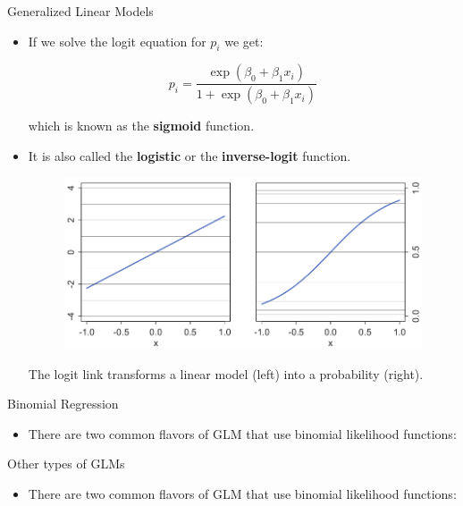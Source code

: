\documentclass[handout]{beamer}
\begin{document}
\begin{frame}{Generalized Linear Models}
\scriptsize{
\begin{itemize}

\item If we solve the logit equation for $p_i$ we get:

\begin{equation}
 p_i = \frac{\exp (\beta_0 + \beta_1 x_i)}{1+\exp (\beta_0 + \beta_1 x_i)}
\end{equation}

which is known as the \textbf{sigmoid} function.

\item It is also called the \textbf{logistic} or the \textbf{inverse-logit} function.

\begin{figure}[h!]
	\centering
	\includegraphics[scale=0.4]{pics/sigmoid.png}
\end{figure}

The logit link transforms a linear model (left) into a probability
(right).

\end{itemize}


}

\end{frame}


\begin{frame}{Binomial Regression}
\scriptsize{
\begin{itemize}

\item There are two common flavors of GLM that use binomial likelihood functions:

\end{itemize}


}

\end{frame}


\begin{frame}{Other types of GLMs}
\scriptsize{
\begin{itemize}

\item There are two common flavors of GLM that use binomial likelihood functions:

\end{itemize}


}

\end{frame}
\end{document}
